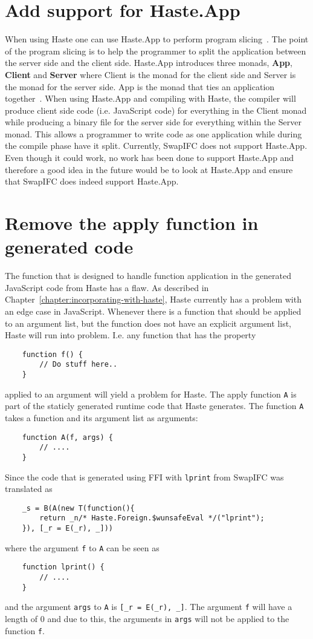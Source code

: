\section{Add support for Haste.App}
\label{chapter:future-haste-app}
When using Haste one can use Haste.App to perform program slicing~\cite{haste-symposium}. The point of the program slicing is to help the programmer to split the application between the server side and the client side. Haste.App introduces three monads, \textbf{App}, \textbf{Client} and \textbf{Server} where Client is the monad for the client side and Server is the monad for the server side. App is the monad that ties an application together~\cite{haste-app}. When using Haste.App and compiling with Haste, the compiler will produce client side code (i.e. JavaScript code) for everything in the Client monad while producing a binary file for the server side for everything within the Server monad. This allows a programmer to write code as one application while during the compile phase have it split. Currently, SwapIFC does not support Haste.App. Even though it could work, no work has been done to support Haste.App and therefore a good idea in the future would be to look at Haste.App and ensure that SwapIFC does indeed support Haste.App.

\section{Remove the apply function in generated code}
The function that is designed to handle function application in the generated JavaScript code from Haste has a flaw. As described in Chapter~\ref{chapter:incorporating-with-haste}, Haste currently has a problem with an edge case in JavaScript. Whenever there is a function that should be applied to an argument list, but the function does not have an explicit argument list, Haste will run into problem. I.e. any function that has the property
\begin{verbatim}
    function f() {
        // Do stuff here..
    }
\end{verbatim}
applied to an argument will yield a problem for Haste. The apply function {\tt A} is part of the staticly generated runtime code that Haste generates. The function {\tt A} takes a function and its argument list as arguments:
\begin{verbatim}
    function A(f, args) {
        // ....
    }
\end{verbatim}
Since the code that is generated using FFI with {\tt lprint} from SwapIFC  was translated as
\begin{verbatim}
    _s = B(A(new T(function(){
        return _n/* Haste.Foreign.$wunsafeEval */("lprint");
    }), [_r = E(_r), _]))
\end{verbatim}
where the argument {\tt f} to {\tt A} can be seen as
\begin{verbatim}
    function lprint() {
        // ....
    }
\end{verbatim}
and the argument {\tt args} to {\tt A} is {\tt [\_r = E(\_r), \_]}. The argument {\tt f} will have a length of 0 and due to this, the arguments in {\tt args} will not be applied to the function {\tt f}.

